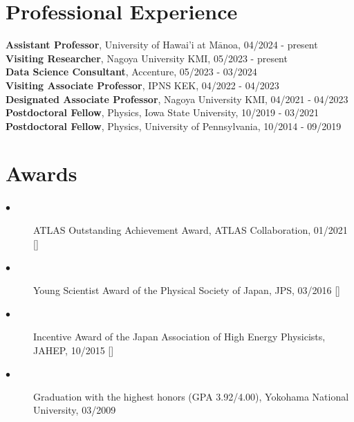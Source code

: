 \documentclass[12pt]{article}
\begin{document}
{%
\vspace{-0.2in}
\section*{\large{Professional Experience}}
{\footnotesize
\textbf{Assistant Professor}, University of Hawai'i at M$\bar{\text{a}}$noa, 04/2024 - present \\
\textbf{Visiting Researcher}, Nagoya University KMI, 05/2023 - present \\
\textbf{Data Science Consultant}, Accenture, 05/2023 - 03/2024 \\
\textbf{Visiting Associate Professor}, IPNS KEK, 04/2022 - 04/2023 \\
\textbf{Designated Associate Professor}, Nagoya University KMI, 04/2021 - 04/2023 \\
\textbf{Postdoctoral Fellow}, Physics, Iowa State University, 10/2019 - 03/2021 \\
\textbf{Postdoctoral Fellow}, Physics, University of Pennsylvania, 10/2014 - 09/2019 
}

\section*{\large{Awards}} 

{\footnotesize
\begin{description}
\item[$\bullet$]{ATLAS Outstanding Achievement Award, ATLAS Collaboration, 01/2021
[]}
\item[$\bullet$]{Young Scientist Award of the Physical Society of Japan, JPS, 03/2016
[]}
\item[$\bullet$]{Incentive Award of the Japan Association of High Energy Physicists, JAHEP, 10/2015
[]}
\item[$\bullet$]{Graduation with the highest honors (GPA 3.92/4.00), Yokohama National University, 03/2009}
\end{description}
}

}
\end{document}
